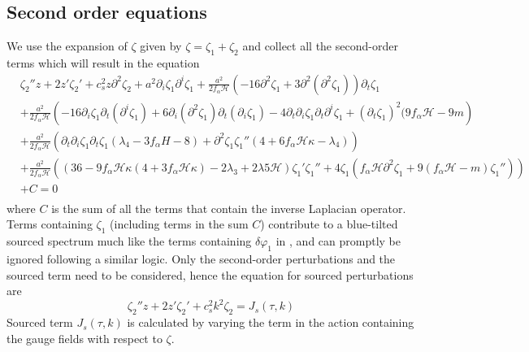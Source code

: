 \documentclass[12pt,a4paper]{article}
\numberwithin{equation}{section}
\numberwithin{equation}{section}
\begin{document}
\subsection{Second order equations}
\label{app:source ekp}
We use the expansion of $\zeta$ given by $\zeta=\zeta_1+\zeta_2$ and collect all the second-order terms which will result in the equation
\begin{equation}
\begin{split}
    &\zeta_2'' z + 2  z' \zeta_2' + c_s^2  z \partial^2 \zeta_2 + a^2 \partial_i\zeta_1 \partial^i \zeta_1+\frac{a^2}{2f_{\alpha}\mathcal{H}}\left(-16\partial^2 \zeta_1+3\partial^2(\partial^2\zeta_1) \right) \partial_t \zeta_1 \\
    & +\frac{a^2}{2f_{\alpha}\mathcal{H}}\left(-16\partial_i \zeta_1 \partial_t(\partial^i\zeta_1)+6\partial_i(\partial^2\zeta_1) \partial_t(\partial_i\zeta_1)-4\partial_t\partial_i\zeta_1 \partial_t\partial^i\zeta_1 +(\partial_t\zeta_1)^2(9f_{\alpha}\mathcal{H}-9m\right)\\
    &+ \frac{a^2}{2f_{\alpha}\mathcal{H}} \left( \partial_t \partial_i \zeta_1 \partial_t \zeta_1(\lambda_4-3f_{\alpha}H-8)+\partial^2 \zeta_1 \zeta_1'' (4+6f_{\alpha}\mathcal{H}\kappa-\lambda_4) \right)\\
    &+ \frac{a^2}{2f_{\alpha}\mathcal{H}}\left((36-9f_{\alpha}\mathcal{H}\kappa(4+3f_{\alpha}\mathcal{H}\kappa)-2\lambda_3+2\lambda 5 \mathcal{H}) \zeta_1'\zeta_1''+4\zeta_1( f_{\alpha}\mathcal{H}\partial^2\zeta_1 +9(f_{\alpha}\mathcal{H}-m) \zeta_1'' ) \right)\\
    &+C=0\\
\end{split}
\end{equation}
where $C$ is the sum of all the terms that contain the inverse Laplacian operator. 
Terms containing 
$\zeta_1$ (including terms in the sum $C$) contribute to a blue-tilted sourced spectrum much like the terms containing $\delta \varphi_1$ in \cite{r4}, and can promptly be ignored following a similar logic. Only the second-order perturbations and the sourced term need to be considered, hence the equation for sourced perturbations are 
\begin{equation}
    \zeta_2'' z + 2  z' \zeta_2' + c_s^2 k^2  \zeta_2  = J_s(\tau,k)
    \label{sms}
\end{equation}
Sourced term $J_s(\tau,k)$ is calculated by varying the term in the action containing the gauge fields with respect to $\zeta$. 
\end{document}
